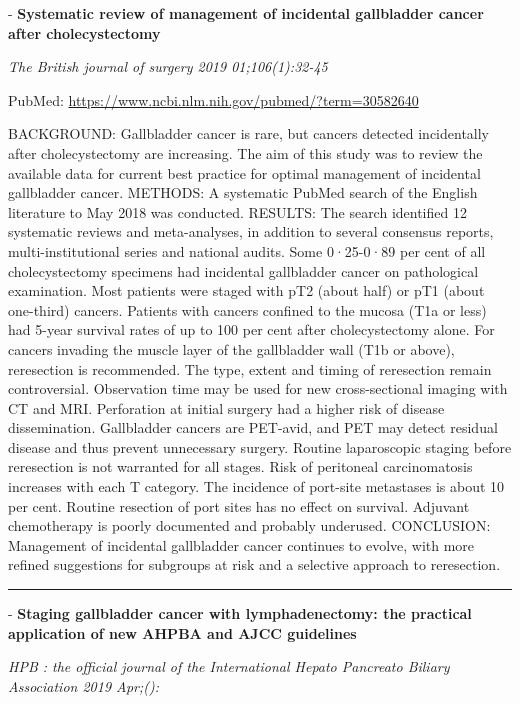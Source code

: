 \documentclass[]{article}
\begin{document}
 - \textbf{Systematic review of management of incidental gallbladder
cancer after cholecystectomy}

\emph{The British journal of surgery 2019 01;106(1):32-45}

PubMed: \url{https://www.ncbi.nlm.nih.gov/pubmed/?term=30582640}

BACKGROUND: Gallbladder cancer is rare, but cancers detected
incidentally after cholecystectomy are increasing. The aim of this study
was to review the available data for current best practice for optimal
management of incidental gallbladder cancer. METHODS: A systematic
PubMed search of the English literature to May 2018 was conducted.
RESULTS: The search identified 12 systematic reviews and meta-analyses,
in addition to several consensus reports, multi-institutional series and
national audits. Some 0·25-0·89 per cent of all cholecystectomy
specimens had incidental gallbladder cancer on pathological examination.
Most patients were staged with pT2 (about half) or pT1 (about one-third)
cancers. Patients with cancers confined to the mucosa (T1a or less) had
5-year survival rates of up to 100 per cent after cholecystectomy alone.
For cancers invading the muscle layer of the gallbladder wall (T1b or
above), reresection is recommended. The type, extent and timing of
reresection remain controversial. Observation time may be used for new
cross-sectional imaging with CT and MRI. Perforation at initial surgery
had a higher risk of disease dissemination. Gallbladder cancers are
PET-avid, and PET may detect residual disease and thus prevent
unnecessary surgery. Routine laparoscopic staging before reresection is
not warranted for all stages. Risk of peritoneal carcinomatosis
increases with each T category. The incidence of port-site metastases is
about 10 per cent. Routine resection of port sites has no effect on
survival. Adjuvant chemotherapy is poorly documented and probably
underused. CONCLUSION: Management of incidental gallbladder cancer
continues to evolve, with more refined suggestions for subgroups at risk
and a selective approach to reresection.

{}

{}

\begin{center}\rule{0.5\linewidth}{\linethickness}\end{center}

 - \textbf{Staging gallbladder cancer with lymphadenectomy: the
practical application of new AHPBA and AJCC guidelines}

\emph{HPB : the official journal of the International Hepato Pancreato
Biliary Association 2019 Apr;():}
\end{document}
